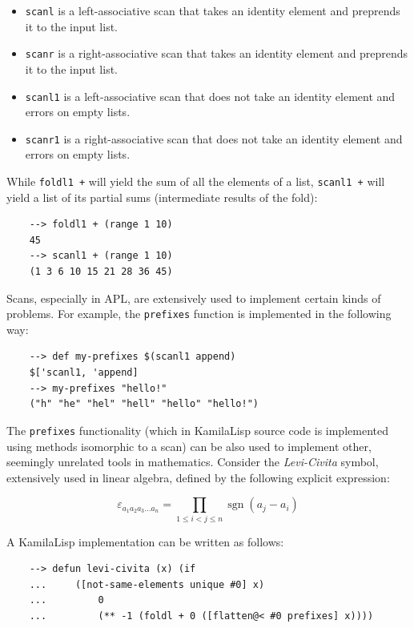 \begin{itemize}
    \item \verb|scanl| is a left-associative scan that takes an identity element and preprends it to the input list.
    \item \verb|scanr| is a right-associative scan that takes an identity element and preprends it to the input list.
    \item \verb|scanl1| is a left-associative scan that does not take an identity element and errors on empty lists.
    \item \verb|scanr1| is a right-associative scan that does not take an identity element and errors on empty lists.
\end{itemize}

While \verb|foldl1 +| will yield the sum of all the elements of a list, \verb|scanl1 +| will yield a list of its partial sums (intermediate results of the fold):

\begin{Verbatim}
    --> foldl1 + (range 1 10)
    45
    --> scanl1 + (range 1 10)
    (1 3 6 10 15 21 28 36 45)
\end{Verbatim}

Scans, especially in APL, are extensively used to implement certain kinds of problems. For example, the \verb|prefixes| function is implemented in the following way:

\begin{Verbatim}
    --> def my-prefixes $(scanl1 append)
    $['scanl1, 'append]
    --> my-prefixes "hello!"
    ("h" "he" "hel" "hell" "hello" "hello!")
\end{Verbatim}

The \verb|prefixes| functionality (which in KamilaLisp source code is implemented using methods isomorphic to a scan) can be also used to implement other, seemingly unrelated tools in mathematics. Consider the \textit{Levi-Civita} symbol, extensively used in linear algebra, defined by the following explicit expression:

$$
{\displaystyle \varepsilon _{a_{1}a_{2}a_{3}\ldots a_{n}}=\prod _{1\leq i<j\leq n}\operatorname {sgn}(a_{j}-a_{i})}
$$

A KamilaLisp implementation can be written as follows:

\begin{Verbatim}
    --> defun levi-civita (x) (if
    ...     ([not-same-elements unique #0] x)
    ...         0
    ...         (** -1 (foldl + 0 ([flatten@< #0 prefixes] x))))
\end{Verbatim}


